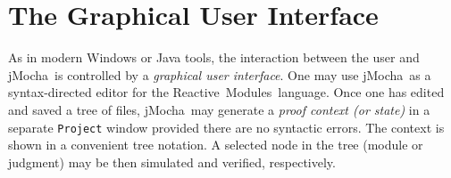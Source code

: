 \documentclass[10pt,twocolumn]{article}
\def\jmocha{{\small\sc jMocha}}
\newcommand{\rem}{\mbox{\small\sc Reactive Modules}}
\begin{document}


\section{The Graphical User Interface}
\label{sec:The Graphical User Interface}

As in modern Windows or Java tools, the interaction between the user and
\jmocha\  is controlled by a \emph{graphical user interface}. 
%
%
One may use \jmocha\ as a syntax-directed editor for the \rem\ 
language.
%
Once one has edited and saved a tree of files, \jmocha\
may generate a \emph{proof context (or state)} in a separate
{\tt Project} window provided 
there are no syntactic errors. The context is shown 
in a convenient tree notation. 
A selected node in the tree (module or judgment) 
may be then simulated and verified, respectively.
\end{document}
